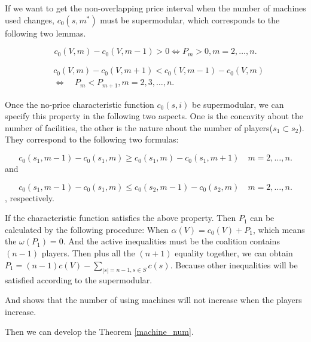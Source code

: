 If we want to get the non-overlapping price interval when the number of machines used changes, $c_0(s,m^*)$ must be supermodular, which corresponds to the following two lemmas.

\begin{lem}\label{price_positive}
\[c_0(V,m)- c_0(V,m-1) > 0 \Leftrightarrow P_m > 0, m=2,\ldots,n.\]
\end{lem}

\begin{lem}\label{non-overlapping}
\[
\begin{aligned}
&c_0 (V,m) - c_0 (V,m+1) < c_0 (V,m-1) - c_0 (V,m) \\
&\Leftrightarrow \quad P_m < P_{m+1} , m=2,3,\ldots,n.
\end{aligned}
\]
\end{lem}

Once the no-price characteristic function $c_0(s,i)$ be supermodular, we can specify this property in the following two aspects.
One is the concavity about the number of facilities,
the other is the nature about the number of players($s_1 \subset s_2$).
They correspond to the following two formulas:

\begin{equation}\label{concavity_f}
c_0(s_1,m-1)-c_0(s_1,m) \geq
  c_0(s_1,m)-c_0(s_1,m+1) \quad m=2,\ldots,n.
\end{equation}
and

\begin{equation}\label{property_p}
	c_0(s_1,m-1)-c_0(s_1,m) \leq
	  c_0(s_2,m-1)-c_0(s_2,m) \quad m=2,\ldots,n.
\end{equation}
, respectively.

If the characteristic function satisfies the above property. Then $ P_1$ can be calculated by the following procedure:
When $\alpha(V) = c_0(V) + P_1$, which means the $\omega(P_1) = 0$. And the active inequalities must be the coalition contains $(n-1)$ players.
Then plus all the $(n+1)$ equality together, we can obtain $P_1 = (n-1)c(V)- \sum_{|s|=n-1,s\in S}c(s)$.
Because other inequalities will be satisfied according to the supermodular.

And shows that the number of using machines will not increase when the players increase.

Then we can develop the Theorem \ref{machine_num}.

